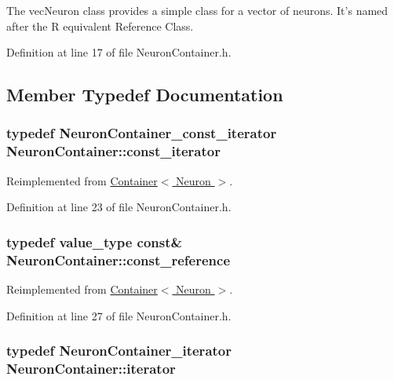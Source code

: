 The vecNeuron class provides a simple class for a vector of neurons. It's named after the R equivalent Reference Class. 

Definition at line 17 of file NeuronContainer.h.



\subsection{Member Typedef Documentation}
\hypertarget{class_neuron_container_a41749602f05e7610da7f0f1fd59f5442}{
\subsubsection[{const\_\-iterator}]{\setlength{\rightskip}{0pt plus 5cm}typedef {\bf NeuronContainer\_\-const\_\-iterator} {\bf NeuronContainer::const\_\-iterator}}}
\label{class_neuron_container_a41749602f05e7610da7f0f1fd59f5442}


Reimplemented from \hyperlink{class_container_a5eabadaffdd508cb623c955eb0af1518}{Container$<$ Neuron $>$}.



Definition at line 23 of file NeuronContainer.h.

\hypertarget{class_neuron_container_a468ffbb00b15553f73da46dd62c91c8d}{
\subsubsection[{const\_\-reference}]{\setlength{\rightskip}{0pt plus 5cm}typedef {\bf value\_\-type} const\& {\bf NeuronContainer::const\_\-reference}}}
\label{class_neuron_container_a468ffbb00b15553f73da46dd62c91c8d}


Reimplemented from \hyperlink{class_container_a8dd7ae9d0687e11d873f98206e961ac1}{Container$<$ Neuron $>$}.



Definition at line 27 of file NeuronContainer.h.

\hypertarget{class_neuron_container_abf81356adaea3bfc64aa03777e9a8def}{
\subsubsection[{iterator}]{\setlength{\rightskip}{0pt plus 5cm}typedef {\bf NeuronContainer\_\-iterator} {\bf NeuronContainer::iterator}}}
\label{class_neuron_container_abf81356adaea3bfc64aa03777e9a8def}


